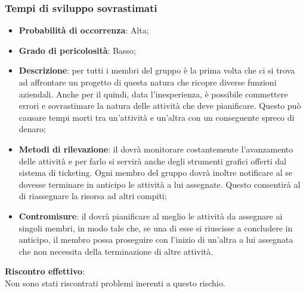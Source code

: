 		\subsubsection{Tempi di sviluppo sovrastimati} %
		\label{ssub:tempi_di_sviluppo_sovrastimati}
			\begin{itemize}
				\item \textbf{Probabilità di occorrenza}: Alta;
				\item \textbf{Grado di pericolosità}: Basso;
				\item \textbf{Descrizione}: per tutti i membri del gruppo è la prima volta che ci si trova ad affrontare un progetto di questa natura che ricopre diverse funzioni aziendali. Anche per il \roleProjectManager{} quindi, data l'inesperienza, è possibile commettere errori e sovrastimare la natura delle attività che deve pianificare. Questo può causare tempi morti tra un'attività e un'altra con un conseguente spreco di denaro;
				\item \textbf{Metodi di rilevazione}: il \roleProjectManager{} dovrà monitorare costantemente l'avanzamento delle attività e per farlo si servirà anche degli strumenti grafici offerti dal sistema di ticketing\gloss{}. Ogni membro del gruppo dovrà inoltre notificare al \roleProjectManager{} se dovesse terminare in anticipo le attività a lui assegnate. Questo consentirà al \roleProjectManager{} di riassegnare la risorsa ad altri compiti;
				\item \textbf{Contromisure}: il \roleProjectManager{} dovrà pianificare al meglio le attività da assegnare ai singoli membri, in modo tale che, se una di esse si riuscisse a concludere in anticipo, il membro possa proseguire con l'inizio di un'altra a lui assegnata che non necessita della terminazione di altre attività.
			\end{itemize}
		\noindent
		\textbf{Riscontro effettivo}: \\
		Non sono stati riscontrati problemi inerenti a questo rischio.
		
	\newpage
